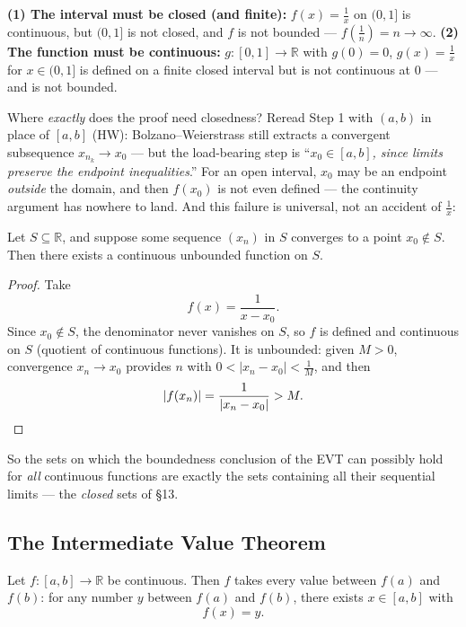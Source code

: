 \documentclass[11pt]{report}
\begin{document}
\begin{rembox}
\textbf{(1) The interval must be closed (and finite):} $f(x) = \tfrac1x$ on $(0,1]$ is continuous, but $(0,1]$ is not closed, and $f$ is not bounded --- $f(\tfrac1n) = n \to \infty$. \textbf{(2) The function must be continuous:} $g: [0,1] \to \mathbb{R}$ with $g(0) = 0$, $g(x) = \tfrac1x$ for $x \in (0,1]$ is defined on a finite closed interval but is not continuous at $0$ --- and is not bounded.
\end{rembox}

Where \emph{exactly} does the proof need closedness? Reread Step 1 with $(a,b)$ in place of $[a,b]$ (HW): Bolzano--Weierstrass still extracts a convergent subsequence $x_{n_k} \to x_0$ --- but the load-bearing step is ``\emph{$x_0 \in [a,b]$, since limits preserve the endpoint inequalities}.'' For an open interval, $x_0$ may be an endpoint \emph{outside} the domain, and then $f(x_0)$ is not even defined --- the continuity argument has nowhere to land. And this failure is universal, not an accident of $\tfrac1x$:

\begin{propbox}
Let $S \subseteq \mathbb{R}$, and suppose some sequence $(x_n)$ in $S$ converges to a point $x_0 \notin S$. Then there exists a continuous unbounded function on $S$.
\end{propbox}

\begin{proof}
Take
\[
f(x) = \frac{1}{x - x_0}.
\]
Since $x_0 \notin S$, the denominator never vanishes on $S$, so $f$ is defined and continuous on $S$ (quotient of continuous functions). It is unbounded: given $M > 0$, convergence $x_n \to x_0$ provides $n$ with $0 < |x_n - x_0| < \tfrac1M$, and then
\[
|f(x_n)| = \frac{1}{|x_n - x_0|} > M. \qedhere
\]
\end{proof}

So the sets on which the boundedness conclusion of the EVT can possibly hold for \emph{all} continuous functions are exactly the sets containing all their sequential limits --- the \emph{closed} sets of \S 13.

\subsection{The Intermediate Value Theorem}

\begin{thmbox}
Let $f: [a,b] \to \mathbb{R}$ be continuous. Then $f$ takes every value between $f(a)$ and $f(b)$: for any number $y$ between $f(a)$ and $f(b)$, there exists $x \in [a,b]$ with
\[
f(x) = y.
\]
\end{thmbox}
\end{document}
